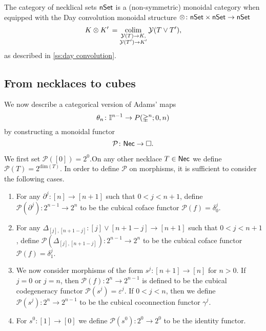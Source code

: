 The category of necklical sets $\mathsf{nSet}$ is a (non-symmetric) monoidal category when equipped with the Day convolution monoidal structure $\otimes \colon \mathsf{nSet} \times \mathsf{nSet} \to \mathsf{nSet}$
\begin{equation*}
K \otimes K' \, = \operatorname*{colim}_{\substack{\mathcal{Y}(T) \to K, \\ \mathcal{Y}(T')\to K'}} \mathcal{Y}(T \vee T'),
\end{equation*}
as described in \cref{ss:day convolution}.

\subsection{From necklaces to cubes}

We now describe a categorical version of Adams' maps
\begin{equation*}
\theta_n \colon \mathbb{I}^{n-1} \to P(\mathbb{\Delta}^{n};0,n)
\end{equation*}
by constructing a monoidal functor
\begin{equation*}
\mathcal{P} \colon \mathsf{Nec} \to \square.
\end{equation*}

We first set $\mathcal{P}([0])=2^0$.On any other necklace $T \in \mathsf{Nec}$ we define $\mathcal{P}( T )= 2^{\text{dim}(T)}$.
In order to define $\mathcal{P}$ on morphisms, it is sufficient to consider the following cases.
\begin{enumerate}
	\item For any $\partial^j \colon [n] \to [n+1]$ such that $0< j<{n+1}$, define $\mathcal{P}(\partial^j) \colon 2^{n-1}\to 2^{n}$ to be the cubical coface functor $\mathcal{P}(f)= \delta_0^{j}.$ 
	
	\item For any $\Delta_{[j], [n+1-j]} \colon [j] \vee [n+1-j] \to [n+1]$ such that $0<j<n+1$, define $\mathcal{P}(\Delta_{[j], [n+1-j]}) \colon 2^{n-1}\to 2^{n}$ to be the cubical coface functor $\mathcal{P}(f)=\delta_1^{j}$.
	
	\item We now consider morphisms of the form $s^j \colon [n+1] \to [n]$ for $n>0$.
	If $j=0$ or $j=n$, then $\mathcal{P}(f) \colon 2^n \to 2^{n-1}$ is defined to be the cubical codegeneracy functor $\mathcal{P}(s^j)= \varepsilon^{j}.$ If $0<j<n$, then we define $\mathcal{P}(s^j) \colon 2^n \to 2^{n-1}$ to be the cubical coconnection functor $\gamma^{j}.$
	
	\item For $s^0 \colon [1] \to [0]$ we define $\mathcal{P}(s^0) \colon 2^0 \to 2^0$ to be the identity functor.
\end{enumerate}

